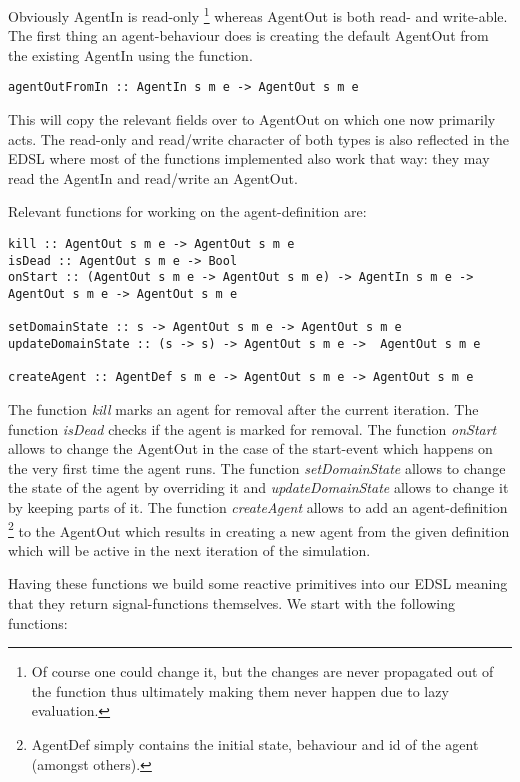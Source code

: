 Obviously AgentIn is read-only \footnote{Of course one could change it, but the changes are never propagated out of the function thus ultimately making them never happen due to lazy evaluation.} whereas AgentOut is both read- and write-able. The first thing an agent-behaviour does is creating the default AgentOut from the existing AgentIn using the function.

\begin{verbatim}
agentOutFromIn :: AgentIn s m e -> AgentOut s m e
\end{verbatim}

This will copy the relevant fields over to AgentOut on which one now primarily acts. The read-only and read/write character of both types is also reflected in the EDSL where most of the functions implemented also work that way: they may read the AgentIn and read/write an AgentOut.

Relevant functions for working on the agent-definition are:

\begin{verbatim}
kill :: AgentOut s m e -> AgentOut s m e
isDead :: AgentOut s m e -> Bool
onStart :: (AgentOut s m e -> AgentOut s m e) -> AgentIn s m e -> AgentOut s m e -> AgentOut s m e

setDomainState :: s -> AgentOut s m e -> AgentOut s m e
updateDomainState :: (s -> s) -> AgentOut s m e ->  AgentOut s m e

createAgent :: AgentDef s m e -> AgentOut s m e -> AgentOut s m e
\end{verbatim}

The function \textit{kill} marks an agent for removal after the current iteration. The function \textit{isDead} checks if the agent is marked for removal. The function \textit{onStart} allows to change the AgentOut in the case of the start-event which happens on the very first time the agent runs.
The function \textit{setDomainState} allows to change the state of the agent by overriding it and \textit{updateDomainState} allows to change it by keeping parts of it.
The function \textit{createAgent} allows to add an agent-definition \footnote{AgentDef simply contains the initial state, behaviour and id of the agent (amongst others).} to the AgentOut which results in creating a new agent from the given definition which will be active in the next iteration of the simulation. 

Having these functions we build some reactive primitives into our EDSL meaning that they return signal-functions themselves. We start with the following functions:

